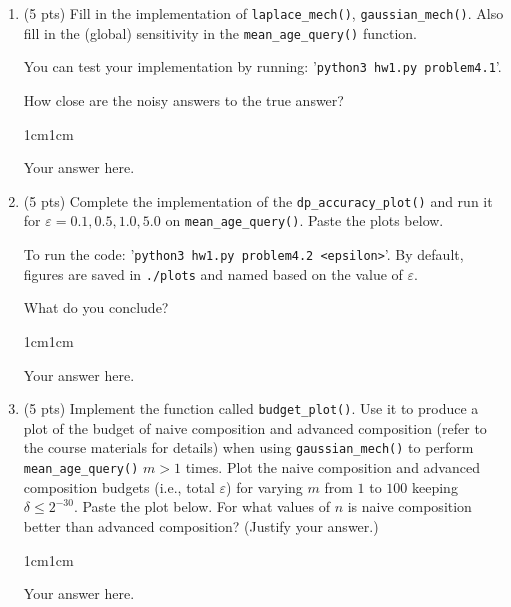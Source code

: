 \documentclass[11pt,letterpaper]{article}
\newenvironment{answer}{\em \color{blue} \begin{adjustwidth}{1cm}{1cm}}{\end{adjustwidth}}
\begin{document}
%
\begin{enumerate}
%
	\item (5 pts) Fill in the implementation of \texttt{laplace\_mech()}, \texttt{gaussian\_mech()}. Also fill in the (global) sensitivity in the \texttt{mean\_age\_query()} function. 
	
	You can test your implementation by running: '\texttt{python3 hw1.py problem4.1}'.
	
	How close are the noisy answers to the true answer?
	
	\begin{answer}
	
		Your answer here.
		
	\end{answer}

	
	\item (5 pts) Complete the implementation of the \texttt{dp\_accuracy\_plot()} and run it for $\varepsilon=0.1, 0.5, 1.0, 5.0$ on \texttt{mean\_age\_query()}. Paste the plots below.
	
	To run the code: '\texttt{python3 hw1.py problem4.2 <epsilon>}'. By default, figures are saved in \texttt{./plots} and named based on the value of $\varepsilon$.
	
	What do you conclude?
	
	\begin{answer}
	
		Your answer here.
		
	\end{answer}
	
	\item (5 pts) Implement the function called \texttt{budget\_plot()}. Use it to produce a plot of the budget of naive composition and advanced composition (refer to the course materials for details) when using \texttt{gaussian\_mech()} to perform \texttt{mean\_age\_query()} $m>1$ times. Plot the naive composition and advanced composition budgets (i.e., total $\varepsilon$) for varying $m$ from $1$ to $100$ keeping $\delta \leq 2^{-30}$. Paste the plot below. For what values of $n$ is naive composition better than advanced composition? (Justify your answer.)
	
	\begin{answer}
	
		Your answer here.
		
	\end{answer}


\end{enumerate}
\end{document}

